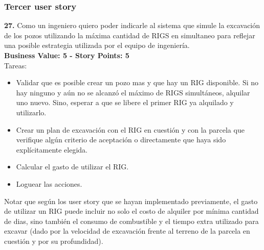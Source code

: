 \subsubsection{Tercer user story}

\textbf{27.} Como un ingeniero quiero poder indicarle al sistema que simule la excavación de los pozos utilizando la máxima cantidad de RIGS en simultaneo para reflejar una posible estrategia utilizada por el equipo de ingeniería.\\
\textbf{Business Value: 5 - Story Points: 5}\\

Tareas:

\begin{itemize}
    \item Validar que es posible crear un pozo mas y que hay un RIG disponible. Si no hay ninguno y aún no se alcanzó el máximo de RIGS simultáneos, alquilar uno nuevo. Sino, esperar a que se libere el primer RIG ya alquilado y utilizarlo.
    \item Crear un plan de excavación con el RIG en cuestión y con la parcela que verifique algún criterio de aceptación o directamente que haya sido explícitamente elegida.
    \item Calcular el gasto de utilizar el RIG.
    \item Loguear las acciones.
\end{itemize}

Notar que según los user story que se hayan implementado previamente, el gasto de utilizar un RIG puede incluir no solo el costo de alquiler por mínima cantidad de dias, sino también el consumo de combustible y el tiempo extra utilizado para excavar (dado por la velocidad de excavación frente al terreno de la parcela en cuestión y por su profundidad).